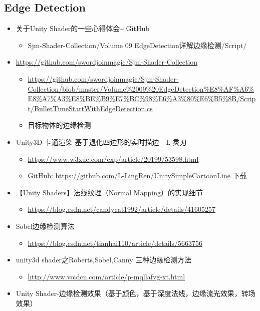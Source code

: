 \documentclass[9pt, b5paper]{article}
\begin{document}
\subsection{Edge Detection}
\label{sec-3-5}
\begin{itemize}
\item 关于Unity Shader的一些心得体会\textasciitilde{} GitHub
\begin{itemize}
\item Sjm-Shader-Collection/Volume 09 EdgeDetection详解边缘检测/Script/
\end{itemize}
\item \url{https://github.com/swordjoinmagic/Sjm-Shader-Collection}
\begin{itemize}
\item \url{https://github.com/swordjoinmagic/Sjm-Shader-Collection/blob/master/Volume\%2009\%20EdgeDetection\%E8\%AF\%A6\%E8\%A7\%A3\%E8\%BE\%B9\%E7\%BC\%98\%E6\%A3\%80\%E6\%B5\%8B/Script/BulletTimeStartWithEdgeDetection.cs}
\item 目标物体的边缘检测
\end{itemize}
\item Unity3D 卡通渲染 基于退化四边形的实时描边 - L-灵刃
\begin{itemize}
\item \url{https://www.w3xue.com/exp/article/20199/53598.html}
\item GitHub: \url{https://github.com/L-LingRen/UnitySimpleCartoonLine} 下载
\end{itemize}
\item 【Unity Shaders】法线纹理（Normal Mapping）的实现细节
\begin{itemize}
\item \url{https://blog.csdn.net/candycat1992/article/details/41605257}
\end{itemize}
\item Sobel边缘检测算法
\begin{itemize}
\item \url{https://blog.csdn.net/tianhai110/article/details/5663756}
\end{itemize}
\item unity3d shader之Roberts,Sobel,Canny 三种边缘检测方法
\begin{itemize}
\item \url{http://www.voidcn.com/article/p-mqllafvg-xt.html}
\end{itemize}
\item Unity Shader-边缘检测效果（基于颜色，基于深度法线，边缘流光效果，转场效果）
\begin{itemize}

\end{itemize}
\end{itemize}
\end{document}
